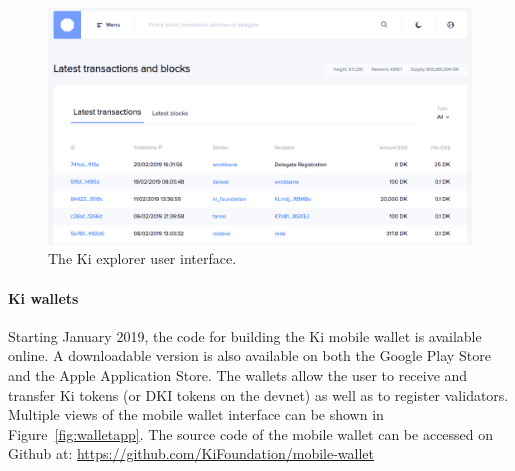 \begin{figure}[h]
	\includegraphics[width=\linewidth, trim= 0cm 0cm 0cm 0cm, clip]{Figures/explorer1}
	\caption{The Ki explorer user interface.}
	\label{fig:explorer}
\end{figure}

\paragraph{Ki wallets} Starting January 2019, the code for building the Ki mobile wallet is available online. A downloadable version is also available on both the Google Play Store and the Apple Application Store. The wallets allow the user to receive and transfer Ki tokens (or DKI tokens on the devnet) as well as to register validators. Multiple views of the mobile wallet interface can be shown in Figure~\ref{fig:walletapp}. The source code of the mobile wallet can be accessed on Github at: \url{https://github.com/KiFoundation/mobile-wallet}

